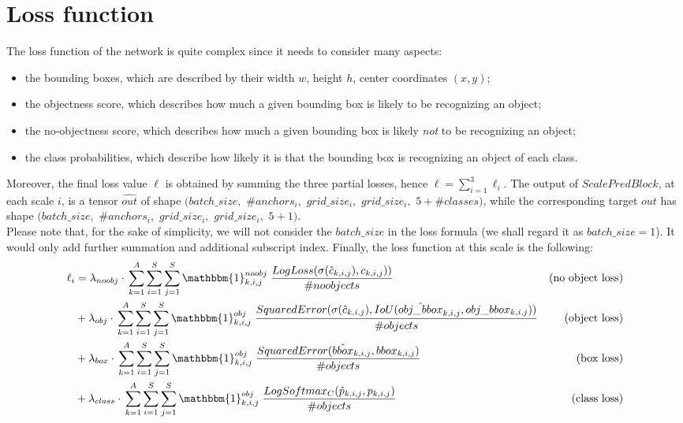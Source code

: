 \documentclass[../report.tex]{subfiles}
\begin{document}
\section{Loss function}\label{s:loss-function}
The loss function of the network is quite complex since it needs to consider many aspects:
\begin{itemize}
    \item the bounding boxes, which are described by their width $w$, height $h$, center coordinates $(x, y)$;
    \item the objectness score, which describes how much a given bounding box is likely to be recognizing an object;
    \item the no-objectness score, which describes how much a given bounding box is likely \textit{not} to be recognizing an object;
    \item the class probabilities, which describe how likely it is that the bounding box is recognizing an object of each class.
\end{itemize}
Moreover, the final loss value $\ell$ is obtained by summing the three partial losses, hence $\ell{} = \sum_{i=1}^{3}{\ell_i}$.\newline
The output of $ScalePredBlock$, at each scale $i$, is a tensor $\hat{out}$ of shape $(batch\_size,$ $\#anchors_i,$ $grid\_size_i,$ $grid\_size_i,$ $5 + \#classes)$, 
while the corresponding target $out$ has shape $(batch\_size,$ $\#anchors_i,$ $grid\_size_i,$ $grid\_size_i,$ $5+1)$.\\
Please note that, for the sake of simplicity, we will not consider the $batch\_size$ in the loss formula (we shall regard it as $batch\_size = 1$). It would only add further summation and additional subscript index.
Finally, the loss function at this scale is the following:
\begin{align*}
    \ell_i &= \lambda_{noobj} \cdot{} 
    \displaystyle\sum_{k=1}^{A}{
        \displaystyle\sum_{i=1}^{S}{
            \displaystyle\sum_{j=1}^{S}{
                \mathbbm{1}_{k,i,j}^{noobj} \; \frac{LogLoss(\sigma(\hat{c}_{k,i,j}), c_{k,i,j}))}{\#noobjects}
            }
        }
    } & \text{(no object loss)}\\
    &+ \lambda_{obj} \cdot{} 
    \displaystyle\sum_{k=1}^{A}{
        \displaystyle\sum_{i=1}^{S}{
            \displaystyle\sum_{j=1}^{S}{
                \mathbbm{1}_{k,i,j}^{obj} \; \frac{SquaredError(\sigma(\hat{c}_{k,i,j}), IoU(\hat{obj\_bbox}_{k,i,j}, obj\_bbox_{k,i,j}))}{\#objects}
            }
        }
    } & \text{(object loss)}\\
    &+ \lambda_{box} \cdot{} 
    \displaystyle\sum_{k=1}^{A}{
        \displaystyle\sum_{i=1}^{S}{
            \displaystyle\sum_{j=1}^{S}{
                \mathbbm{1}_{k,i,j}^{obj} \; \frac{SquaredError(\hat{bbox}_{k,i,j}, bbox_{k,i,j})}{\#objects}
            }
        }
    } & \text{(box loss)}\\
    &+ \lambda_{class} \cdot{} 
    \displaystyle\sum_{k=1}^{A}{
        \displaystyle\sum_{i=1}^{S}{
            \displaystyle\sum_{j=1}^{S}{
                \mathbbm{1}_{k,i,j}^{obj} \; \frac{LogSoftmax_C(\hat{p}_{k,i,j}, p_{k,i,j})}{\#objects}
            }
        }
    } & \text{(class loss)}\\
\end{align*}
\end{document}
